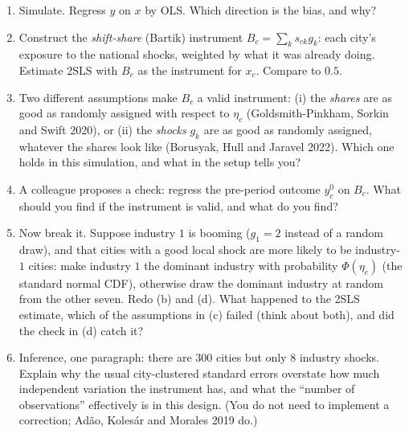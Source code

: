 \documentclass[11pt]{article}
\begin{document}
\begin{enumerate}[label=(\alph*)]
\item Simulate. Regress $y$ on $x$ by OLS. Which direction is the bias, and why?
\item Construct the \emph{shift-share} (Bartik) instrument $B_{c} = \sum_{k} s_{ck} g_{k}$:
each city's exposure to the national shocks, weighted by what it was already doing. Estimate
2SLS with $B_{c}$ as the instrument for $x_{c}$. Compare to $0.5$.
\item Two different assumptions make $B_{c}$ a valid instrument: (i) the \emph{shares} are
as good as randomly assigned with respect to $\eta_{c}$ (Goldsmith-Pinkham, Sorkin and Swift
2020), or (ii) the \emph{shocks} $g_{k}$ are as good as randomly assigned, whatever the
shares look like (Borusyak, Hull and Jaravel 2022). Which one holds in this simulation, and
what in the setup tells you?
\item A colleague proposes a check: regress the pre-period outcome $y^{0}_{c}$ on $B_{c}$. What
should you find if the instrument is valid, and what do you find?
\item Now break it. Suppose industry $1$ is booming ($g_{1} = 2$ instead of a random draw), and
that cities with a good local shock are more likely to be industry-$1$ cities: make industry $1$
the dominant industry with probability $\Phi(\eta_{c})$ (the standard normal CDF), otherwise
draw the dominant industry at random from the other seven. Redo (b) and (d). What happened to
the 2SLS estimate, which of the assumptions in (c) failed (think about both), and did the check in (d) catch it?
\item Inference, one paragraph: there are $300$ cities but only $8$ industry shocks.
Explain why the usual city-clustered standard errors overstate how much independent variation
the instrument has, and what the ``number of observations'' effectively is in this design.
(You do not need to implement a correction; Ad\~ao, Koles\'ar and Morales 2019 do.)
\end{enumerate}
\end{document}
